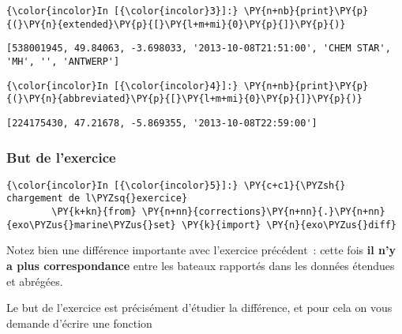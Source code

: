     \begin{Verbatim}[commandchars=\\\{\},frame=single,framerule=0.3mm,rulecolor=\color{cellframecolor}]
{\color{incolor}In [{\color{incolor}3}]:} \PY{n+nb}{print}\PY{p}{(}\PY{n}{extended}\PY{p}{[}\PY{l+m+mi}{0}\PY{p}{]}\PY{p}{)}
\end{Verbatim}


    \begin{Verbatim}[commandchars=\\\{\},frame=single,framerule=0.3mm,rulecolor=\color{cellframecolor}]
[538001945, 49.84063, -3.698033, '2013-10-08T21:51:00', 'CHEM STAR', 'MH', '', 'ANTWERP']
\end{Verbatim}

    \begin{Verbatim}[commandchars=\\\{\},frame=single,framerule=0.3mm,rulecolor=\color{cellframecolor}]
{\color{incolor}In [{\color{incolor}4}]:} \PY{n+nb}{print}\PY{p}{(}\PY{n}{abbreviated}\PY{p}{[}\PY{l+m+mi}{0}\PY{p}{]}\PY{p}{)}
\end{Verbatim}


    \begin{Verbatim}[commandchars=\\\{\},frame=single,framerule=0.3mm,rulecolor=\color{cellframecolor}]
[224175430, 47.21678, -5.869355, '2013-10-08T22:59:00']
\end{Verbatim}

    \hypertarget{but-de-lexercice}{%
\subsubsection{But de l'exercice}\label{but-de-lexercice}}

    \begin{Verbatim}[commandchars=\\\{\},frame=single,framerule=0.3mm,rulecolor=\color{cellframecolor}]
{\color{incolor}In [{\color{incolor}5}]:} \PY{c+c1}{\PYZsh{} chargement de l\PYZsq{}exercice}
        \PY{k+kn}{from} \PY{n+nn}{corrections}\PY{n+nn}{.}\PY{n+nn}{exo\PYZus{}marine\PYZus{}set} \PY{k}{import} \PY{n}{exo\PYZus{}diff}
\end{Verbatim}


    Notez bien une différence importante avec l'exercice précédent~: cette
fois \textbf{il n'y a plus correspondance} entre les bateaux rapportés
dans les données étendues et abrégées.

Le but de l'exercice est précisément d'étudier la différence, et pour
cela on vous demande d'écrire une fonction

